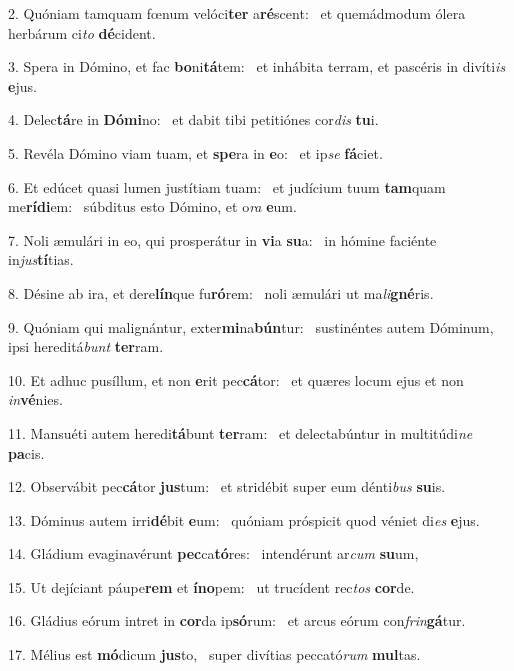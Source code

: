 2. Quóniam tamquam fœnum velóci\textbf{ter} a\textbf{ré}scent: \ast\  et quemádmodum ólera herbárum ci\textit{to} \textbf{dé}cident.\

3. Spera in Dómino, et fac \textbf{bo}ni\textbf{tá}tem: \ast\  et inhábita terram, et pascéris in divíti\textit{is} \textbf{e}jus.\

4. Delec\textbf{tá}re in \textbf{Dó}\textbf{mi}no: \ast\  et dabit tibi petitiónes cor\textit{dis} \textbf{tu}i.\

5. Revéla Dómino viam tuam, et \textbf{spe}ra in \textbf{e}o: \ast\  et ip\textit{se} \textbf{fá}ciet.\

6. Et edúcet quasi lumen justítiam tuam: \dag\  et judícium tuum \textbf{tam}quam me\textbf{rí}\textbf{di}em: \ast\  súbditus esto Dómino, et o\textit{ra} \textbf{e}um.\

7. Noli æmulári in eo, qui prosperátur in \textbf{vi}a \textbf{su}a: \ast\  in hómine faciénte in\textit{jus}\textbf{tí}tias.\

8. Désine ab ira, et dere\textbf{lín}que fu\textbf{ró}rem: \ast\  noli æmulári ut ma\textit{li}\textbf{gné}ris.\

9. Quóniam qui malignántur, exter\textbf{mi}na\textbf{bún}tur: \ast\  sustinéntes autem Dóminum, ipsi hereditá\textit{bunt} \textbf{ter}ram.\

10. Et adhuc pusíllum, et non \textbf{e}rit pec\textbf{cá}tor: \ast\  et quæres locum ejus et non \textit{in}\textbf{vé}nies.\

11. Mansuéti autem heredi\textbf{tá}bunt \textbf{ter}ram: \ast\  et delectabúntur in multitúdi\textit{ne} \textbf{pa}cis.\

12. Observábit pec\textbf{cá}tor \textbf{jus}tum: \ast\  et stridébit super eum dénti\textit{bus} \textbf{su}is.\

13. Dóminus autem irri\textbf{dé}bit \textbf{e}um: \ast\  quóniam próspicit quod véniet di\textit{es} \textbf{e}jus.\

14. Gládium evaginavérunt \textbf{pec}ca\textbf{tó}res: \ast\  intendérunt ar\textit{cum} \textbf{su}um,\

15. Ut dejíciant páupe\textbf{rem} et \textbf{ín}\textbf{o}pem: \ast\  ut trucídent rec\textit{tos} \textbf{cor}de.\

16. Gládius eórum intret in \textbf{cor}da ip\textbf{só}rum: \ast\  et arcus eórum con\textit{frin}\textbf{gá}tur.\

17. Mélius est \textbf{mó}dicum \textbf{jus}to, \ast\  super divítias peccató\textit{rum} \textbf{mul}tas.\


